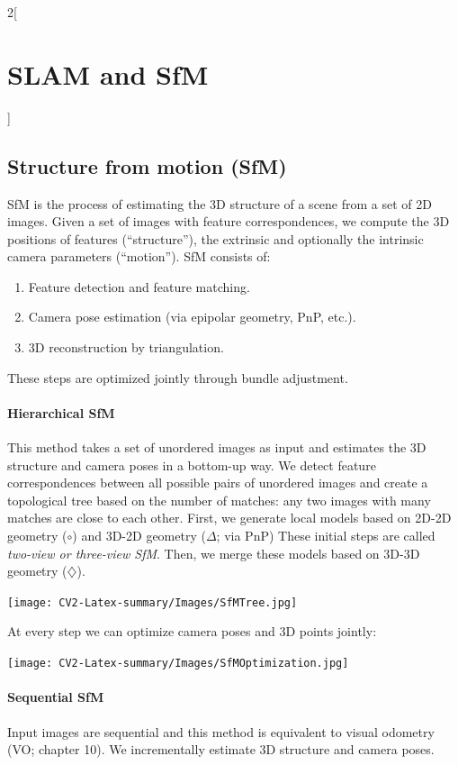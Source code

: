 \documentclass[oneside,fontsize=11pt,paper=a4]{scrartcl}
\begin{document}
\begin{multicols}{2}[\section{SLAM and SfM}]

\subsection{Structure from motion (SfM)}

SfM is the process of estimating the 3D structure of a scene from a set of 2D images. Given a set of images with feature correspondences, we compute the 3D positions of features (``structure''), the extrinsic and optionally the intrinsic camera parameters (``motion''). SfM consists of:
\begin{enumerate}
    \item Feature detection and feature matching.
    \item Camera pose estimation (via epipolar geometry, PnP, etc.).
    \item 3D reconstruction by triangulation.
\end{enumerate}
These steps are optimized jointly through bundle adjustment.

\paragraph{Hierarchical SfM} This method takes a set of unordered images as input and estimates the 3D structure and camera poses in a bottom-up way. We detect feature correspondences between all possible pairs of unordered images and create a topological tree based on the number of matches: any two images with many matches are close to each other. First, we generate local models based on {\color{yellow}2D-2D} geometry ($\circ$) and {\color{orange}3D-2D} geometry ($\Delta$; via PnP) These initial steps are called \textit{two-view or three-view SfM}. Then, we merge these models based on {\color{green}3D-3D} geometry ($\diamondsuit$). 
\begin{center}
    \texttt{[image: CV2-Latex-summary/Images/SfMTree.jpg]}
\end{center}
At every step we can optimize camera poses and 3D points jointly:
\begin{center}
    \texttt{[image: CV2-Latex-summary/Images/SfMOptimization.jpg]}
\end{center}

\paragraph{Sequential SfM} Input images are sequential and this method is equivalent to visual odometry (VO; chapter 10). We incrementally estimate 3D structure and camera poses.


\end{multicols}
\end{document}
